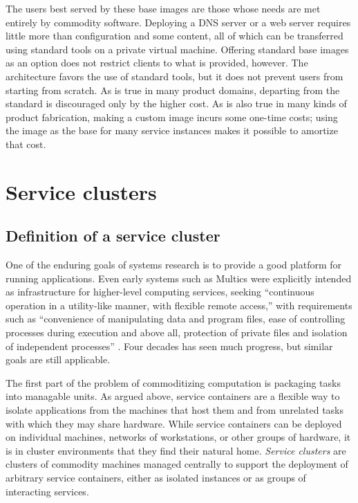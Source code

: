 The users best served by these base images are those whose needs are met entirely by commodity software. Deploying a DNS server or a web server requires little more than configuration and some content, all of which can be transferred using standard tools on a private virtual machine. Offering standard base images as an option does not restrict clients to what is provided, however. The architecture favors the use of standard tools, but it does not prevent users from starting from scratch. As is true in many product domains, departing from the standard is discouraged only by the higher cost. As is also true in many kinds of product fabrication, making a custom image incurs some one-time costs; using the image as the base for many service instances makes it possible to amortize that cost.

\section{Service clusters}

\subsection{Definition of a service cluster}

One of the enduring goals of systems research is to provide a good platform for running applications. Even early systems such as Multics were explicitly intended as infrastructure for higher-level computing services, seeking ``continuous operation in a utility-like manner, with flexible remote access,'' with requirements such as ``convenience of manipulating data and program files, ease of controlling processes during execution and above all, protection of private files and isolation of independent processes'' \cite{corbato}. Four decades has seen much progress, but similar goals are still applicable.

The first part of the problem of commoditizing computation is packaging tasks into managable units. As argued above, service containers are a flexible way to isolate applications from the machines that host them and from unrelated tasks with which they may share hardware. While service containers can be deployed on individual machines, networks of workstations, or other groups of hardware, it is in cluster environments that they find their natural home. \emph{Service clusters} are clusters of commodity machines managed centrally to support the deployment of arbitrary service containers, either as isolated instances or as groups of interacting services.

